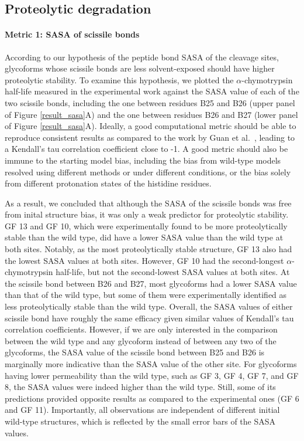 \documentclass[9pt]{elife}
\begin{document}
\subsection{Proteolytic degradation}
\paragraph{Metric 1: SASA of scissile bonds}
According to our hypothesis of the peptide bond SASA of the cleavage sites, glycoforms whose scissile bonds are less solvent-exposed should have higher proteolytic stability. To examine this hypothesis, we plotted the $\alpha$-chymotrypsin half-life measured in the experimental work against the SASA value of each of the two scissile bonds, including the one between residues B25 and B26 (upper panel of Figure \ref{result_sasa}A) and the one between residues B26 and B27 (lower panel of Figure \ref{result_sasa}A). Ideally, a good computational metric should be able to reproduce consistent results as compared to the work by Guan et al.~\cite{guan2018chemically}, leading to a Kendall's tau correlation coefficient close to -1. A good metric should also be immune to the starting model bias, including the bias from wild-type models resolved using different methods or under different conditions, or the bias solely from different protonation states of the histidine residues. 

As a result, we concluded that although the SASA of the scissile bonds was free from inital structure bias, it was only a weak predictor for proteolytic stability. GF 13 and GF 10, which were experimentally found to be more proteolytically stable than the wild type, did have a lower SASA value than the wild type at both sites. Notably, as the most proteolytically stable structure, GF 13 also had the lowest SASA values at both sites. However, GF 10 had the second-longest $\alpha$-chymotrypsin half-life, but not the second-lowest SASA values at both sites. At the scissile bond between B26 and B27, most glycoforms had a lower SASA value than that of the wild type, but some of them were experimentally identified as less proteolytically stable than the wild type. Overall, the SASA values of either scissile bond have roughly the same efficacy given similar values of Kendall's tau correlation coefficients. However, if we are only interested in the comparison between the wild type and any glycoform instead of between any two of the glycoforms, the SASA value of the scissile bond between B25 and B26 is marginally more indicative than the SASA value of the other site. For glycoforms having lower permeability than the wild type, such as GF 3, GF 4, GF 7, and GF 8, the SASA values were indeed higher than the wild type. Still, some of its predictions provided opposite results as compared to the experimental ones (GF 6 and GF 11). Importantly, all observations are independent of different initial wild-type structures, which is reflected by the small error bars of the SASA values. 
\end{document}
